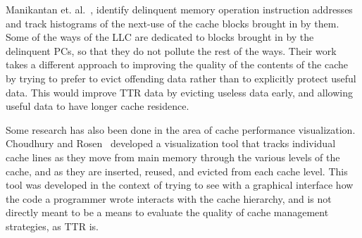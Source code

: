 

Manikantan et. al.~\cite{manikantanrajan11}, identify delinquent memory operation instruction addresses
and track histograms of the next-use of the cache blocks brought in by them.
Some of the ways of the LLC are dedicated to blocks brought in by the
delinquent PCs, so that they do not pollute the rest of the ways.
Their work takes a different approach to improving the quality of the contents of the cache
by trying to prefer to evict offending data rather than to explicitly protect useful data.  This would 
improve TTR data by evicting useless data early, and allowing useful data to have longer cache residence.

Some research has also been done in the area of cache performance visualization.
Choudhury and Rosen~\cite{choudhury2011} developed a visualization tool that 
tracks individual cache lines as they move from main memory through the
various levels of the cache, and as they are inserted, reused, and evicted 
from each cache level.  This tool was developed in the context of trying
to see with a graphical interface how the code a programmer wrote interacts with the cache hierarchy,
and is not directly meant to be a means to evaluate the quality of cache management strategies, as TTR is.



